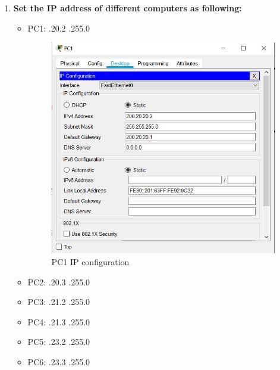 \documentclass[a4paper,11pt]{article}
\begin{document}
\begin{enumerate}
    \item\textbf{ Set the IP address of different computers as following:}

          \begin{itemize}


              \item PC1: \quad {}.20.2 \quad {}.255.0
                    \begin{figure}[H]
                        \centering
                        \includegraphics[scale=0.65,cframe=blue 0.5pt 3pt]{PC1 ip.jpg}
                        \caption{PC1 IP configuration}
                    \end{figure}

              \item PC2: \quad {}.20.3 \quad {}.255.0
              \item PC3: \quad {}.21.2 \quad {}.255.0
              \item PC4: \quad {}.21.3 \quad {}.255.0
              \item PC5: \quad {}.23.2 \quad {}.255.0
              \item PC6: \quad {}.23.3 \quad {}.255.0
          \end{itemize}


\end{enumerate}
\end{document}
